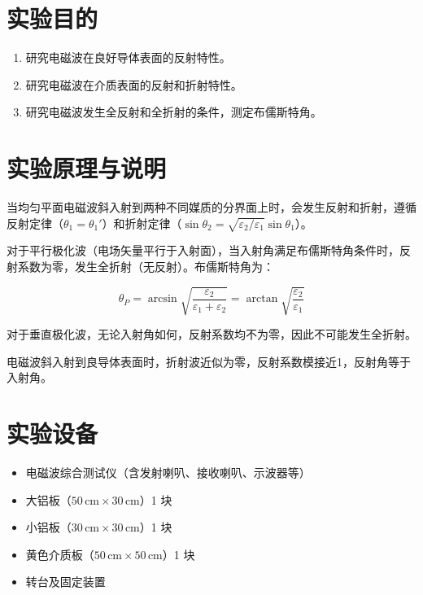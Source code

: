 \documentclass{../ElectromagneticFieldTemplate}
\begin{document}
\maketitle


\section{实验目的}

\begin{enumerate}
    \item 研究电磁波在良好导体表面的反射特性。
    \item 研究电磁波在介质表面的反射和折射特性。
    \item 研究电磁波发生全反射和全折射的条件，测定布儒斯特角。
\end{enumerate}

\section{实验原理与说明}

当均匀平面电磁波斜入射到两种不同媒质的分界面上时，会发生反射和折射，遵循反射定律（\(\theta_1 = \theta_1'\)）和折射定律（\(\sin\theta_2 = \sqrt{\varepsilon_2/\varepsilon_1}\sin\theta_1\)）。

对于平行极化波（电场矢量平行于入射面），当入射角满足布儒斯特角条件时，反射系数为零，发生全折射（无反射）。布儒斯特角为：

\[
\theta_P = \arcsin\sqrt{\frac{\varepsilon_2}{\varepsilon_1 + \varepsilon_2}} = \arctan\sqrt{\frac{\varepsilon_2}{\varepsilon_1}}
\]

对于垂直极化波，无论入射角如何，反射系数均不为零，因此不可能发生全折射。

电磁波斜入射到良导体表面时，折射波近似为零，反射系数模接近1，反射角等于入射角。

\section{实验设备}

\begin{itemize}
    \item 电磁波综合测试仪（含发射喇叭、接收喇叭、示波器等）
    \item 大铝板（\(50\,\text{cm} \times 30\,\text{cm}\)）1 块
    \item 小铝板（\(30\,\text{cm} \times 30\,\text{cm}\)）1 块
    \item 黄色介质板（\(50\,\text{cm} \times 50\,\text{cm}\)）1 块
    \item 转台及固定装置
\end{itemize}
\end{document}
